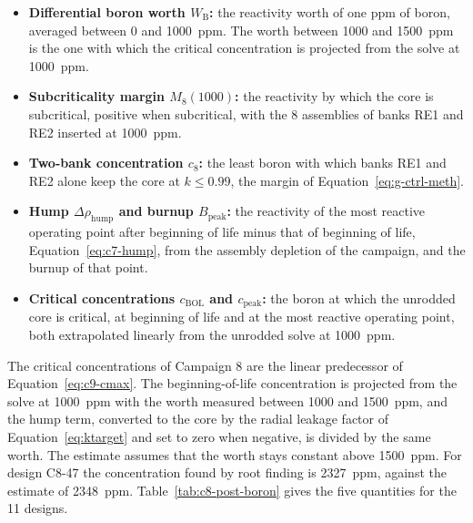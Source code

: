 \begin{itemize}
  \item \textbf{Differential boron worth $W_\mathrm{B}$:} the
        reactivity worth of one ppm of boron, averaged between 0 and
        \SI{1000}{ppm}. The worth between 1000 and \SI{1500}{ppm} is the one
        with which the critical concentration is projected from the
        solve at \SI{1000}{ppm}.
  \item \textbf{Subcriticality margin $M_8(1000)$:} the reactivity by
        which the core is subcritical, positive when subcritical, with
        the 8 assemblies of banks RE1 and RE2 inserted at
        \SI{1000}{ppm}.
  \item \textbf{Two-bank concentration $c_8$:} the least boron with
        which banks RE1 and RE2 alone keep the core at $k \le 0.99$,
        the margin of Equation~\eqref{eq:g-ctrl-meth}.
  \item \textbf{Hump $\Delta\rho_\mathrm{hump}$ and burnup
        $B_\mathrm{peak}$:} the reactivity of the most reactive
        operating point after beginning of life minus that of beginning
        of life, Equation~\eqref{eq:c7-hump}, from the assembly
        depletion of the campaign, and the burnup of that point.
  \item \textbf{Critical concentrations $c_\mathrm{BOL}$ and
        $c_\mathrm{peak}$:} the boron at which the unrodded core is
        critical, at beginning of life and at the most reactive
        operating point, both extrapolated linearly from the unrodded
        solve at \SI{1000}{ppm}.
\end{itemize}

The critical concentrations of Campaign 8 are the linear predecessor
of Equation~\eqref{eq:c9-cmax}. The beginning-of-life concentration is
projected from the solve at \SI{1000}{ppm} with the worth measured
between 1000 and \SI{1500}{ppm}, and the hump term, converted to the
core by the radial leakage factor of Equation~\eqref{eq:ktarget} and
set to zero when negative, is divided by the same worth. The estimate
assumes that the worth stays constant above \SI{1500}{ppm}. For design
C8-47 the concentration found by root finding is \SI{2327}{ppm},
against the estimate of \SI{2348}{ppm}. Table~\ref{tab:c8-post-boron}
gives the five quantities for the 11 designs.

